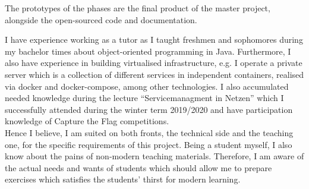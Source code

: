 The prototypes of the phases are the final product of the master project, alongside the open-sourced code and documentation.


I have experience working as a tutor as I taught freshmen and sophomores during my bachelor times about object-oriented programming in Java.
Furthermore, I also have experience in building virtualised infrastructure, e.g. I operate a private server which is a collection of different services in independent containers, realised via docker and docker-compose, among other technologies.
I also accumulated needed knowledge during the lecture \enquote{Servicemanagment in Netzen} which I successfully attended during the winter term 2019/2020 and have participation knowledge of Capture the Flag competitions. \\
Hence I believe, I am suited on both fronts, the technical side and the teaching one, for the specific requirements of this project.
Being a student myself, I also know about the pains of non-modern teaching materials.
Therefore, I am aware of the actual needs and wants of students which should allow me to prepare exercises which satisfies the students' thirst for modern learning.
